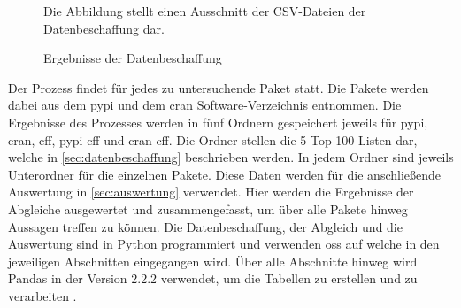 \begin{figure}
    \centering
    \caption{Ergebnisse der Datenbeschaffung}
    \label{fig:datenbeschaffung_ergebnisse}
    \small
    \raggedright
    Die Abbildung stellt einen Ausschnitt der CSV-Dateien der Datenbeschaffung dar.
\end{figure}

Der Prozess findet für jedes zu untersuchende Paket statt.
Die Pakete werden dabei aus dem \gls{pypi} und dem \gls{cran} Software-Verzeichnis entnommen.
Die Ergebnisse des Prozesses werden in fünf Ordnern gespeichert jeweils für \gls{pypi}, \gls{cran}, \gls{cff}, \gls{pypi} \gls{cff} und \gls{cran} \gls{cff}.
Die Ordner stellen die 5 Top 100 Listen dar, welche in \autoref{sec:datenbeschaffung} beschrieben werden.
In jedem Ordner sind jeweils Unterordner für die einzelnen Pakete.
Diese Daten werden für die anschließende Auswertung in \autoref{sec:auswertung} verwendet.
Hier werden die Ergebnisse der Abgleiche ausgewertet und zusammengefasst, um über alle Pakete hinweg Aussagen treffen zu können.
Die Datenbeschaffung, der Abgleich und die Auswertung sind in Python programmiert und verwenden \gls{oss} auf welche in den jeweiligen Abschnitten eingegangen wird.
Über alle Abschnitte hinweg wird Pandas in der Version 2.2.2 verwendet, um die Tabellen zu erstellen und zu verarbeiten \autocite{the_pandas_development_team_pandas-devpandas_2024}.





